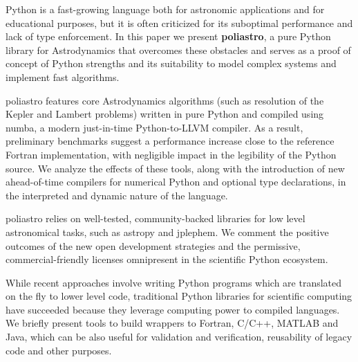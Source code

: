Python is a fast-growing language both for astronomic applications and for educational purposes, but it is often criticized for its suboptimal performance and lack of type enforcement. In this paper we present \textbf{poliastro}, a pure Python library for Astrodynamics that overcomes these obstacles and serves as a proof of concept of Python strengths and its suitability to model complex systems and implement fast algorithms.

poliastro features core Astrodynamics algorithms (such as resolution of the Kepler and Lambert problems) written in pure Python and compiled using numba, a modern just-in-time Python-to-LLVM compiler. As a result, preliminary benchmarks suggest a performance increase close to the reference Fortran implementation, with negligible impact in the legibility of the Python source. We analyze the effects of these tools, along with the introduction of new ahead-of-time compilers for numerical Python and optional type declarations, in the interpreted and dynamic nature of the language.

poliastro relies on well-tested, community-backed libraries for low level astronomical tasks, such as astropy and jplephem. We comment the positive outcomes of the new open development strategies and the permissive, commercial-friendly licenses omnipresent in the scientific Python ecosystem.

While recent approaches involve writing Python programs which are translated on the fly to lower level code, traditional Python libraries for scientific computing have succeeded because they leverage computing power to compiled languages. We briefly present tools to build wrappers to Fortran, C/C++, MATLAB and Java, which can be also useful for validation and verification, reusability of legacy code and other purposes.